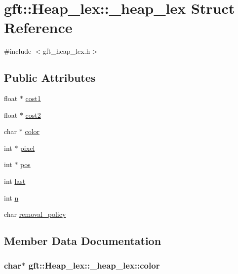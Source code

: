 \hypertarget{structgft_1_1Heap__lex_1_1__heap__lex}{}\section{gft\+:\+:Heap\+\_\+lex\+:\+:\+\_\+heap\+\_\+lex Struct Reference}
\label{structgft_1_1Heap__lex_1_1__heap__lex}


{\ttfamily \#include $<$gft\+\_\+heap\+\_\+lex.\+h$>$}

\subsection*{Public Attributes}
\begin{DoxyCompactItemize}
\item 
float $\ast$ \hyperlink{structgft_1_1Heap__lex_1_1__heap__lex_adb994da50748c66c60baaeb1cc7e9621}{cost1}
\item 
float $\ast$ \hyperlink{structgft_1_1Heap__lex_1_1__heap__lex_a3466f5f8156f9a78243e1cb0681e4543}{cost2}
\item 
char $\ast$ \hyperlink{structgft_1_1Heap__lex_1_1__heap__lex_a2d27af429b7cb96b06c3804f30213571}{color}
\item 
int $\ast$ \hyperlink{structgft_1_1Heap__lex_1_1__heap__lex_ad0959c04c1544378684b566f6d2cbe8c}{pixel}
\item 
int $\ast$ \hyperlink{structgft_1_1Heap__lex_1_1__heap__lex_a5930686532a650d25969bba672e88d35}{pos}
\item 
int \hyperlink{structgft_1_1Heap__lex_1_1__heap__lex_a1fa6dd90ba48e743b9c1f8550503fc53}{last}
\item 
int \hyperlink{structgft_1_1Heap__lex_1_1__heap__lex_a1401a3c1ed4b831f50b513034b7e881a}{n}
\item 
char \hyperlink{structgft_1_1Heap__lex_1_1__heap__lex_ae260010a97dcb6824b62a594d3477709}{removal\+\_\+policy}
\end{DoxyCompactItemize}


\subsection{Member Data Documentation}
\subsubsection[{\texorpdfstring{color}{color}}]{\setlength{\rightskip}{0pt plus 5cm}char$\ast$ gft\+::\+Heap\+\_\+lex\+::\+\_\+heap\+\_\+lex\+::color}\hypertarget{structgft_1_1Heap__lex_1_1__heap__lex_a2d27af429b7cb96b06c3804f30213571}{}\label{structgft_1_1Heap__lex_1_1__heap__lex_a2d27af429b7cb96b06c3804f30213571}
